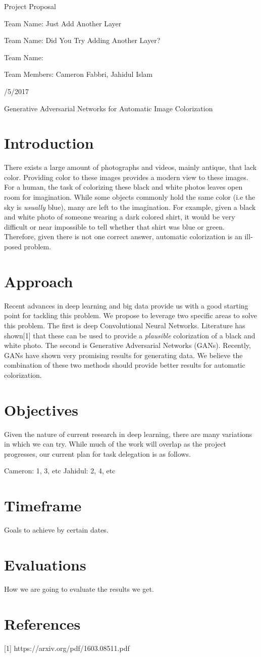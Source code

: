 \documentclass{article}
\begin{document}
\centerline{\sc \large Project Proposal}
\vspace{.5pc}
\centerline{\sc Team Name: Just Add Another Layer}
\centerline{\sc Team Name: Did You Try Adding Another Layer?}
\centerline{\sc Team Name: }
\centerline{\sc Team Members: Cameron Fabbri, Jahidul Islam}
\centerline{/5/2017}
\vspace{2pc}

\centerline{\sc \large Generative Adversarial Networks for Automatic Image Colorization }

\section{Introduction}
There exists a large amount of photographs and videos, mainly antique, that lack color.
Providing color to these images provides a modern view to these images. For a human,
the task of colorizing these black and white photos leaves open room for imagination. While
some objects commonly hold the same color (i.e the sky is \textit{usually} blue), many are
left to the imagination. For example, given a black and white photo of someone wearing a dark
colored shirt, it would be very difficult or near impossible to tell whether that shirt was
blue or green. Therefore, given there is not one correct answer, automatic colorization is an
ill-posed problem.

\section{Approach}
Recent advances in deep learning and big data provide us with a good starting point for tackling this
problem. We propose to leverage two specific areas to solve this problem. The first is deep Convolutional
Neural Networks. Literature has shown[1] that these can be used to provide a \textit{plausible}
colorization of a black and white photo. The second is Generative Adversarial Networks (GANs). Recently,
GANs have shown very promising results for generating data. We believe the combination of these two
methods should provide better results for automatic colorization.

\section{Objectives}
Given the nature of current research in deep learning, there are many variations in which we
can try. 
While much of the work will overlap as the project progresses, our current plan for task
delegation is as follows.

Cameron: 1, 3, etc
Jahidul: 2, 4, etc

\section{Timeframe}
Goals to achieve by certain dates.


\section{Evaluations}
How we are going to evaluate the results we get.



\section{References}
[1] https://arxiv.org/pdf/1603.08511.pdf
\end{document}
